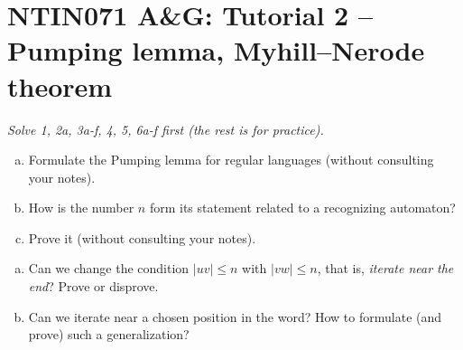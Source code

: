 \documentclass[a4paper,12pt]{amsart}
\begin{document}

\section*{NTIN071 A\&G: Tutorial 2 -- Pumping lemma, Myhill--Nerode theorem}


\medskip

\noindent\emph{Solve 1, 2a, 3a-f, 4, 5, 6a-f  first (the rest is for practice).}

\medskip

\medskip\begin{problem}
    
    \begin{enumerate}[(a)]\setlength\itemsep{12pt}
        \item Formulate the Pumping lemma for regular languages (without consulting your notes).
        \item How is the number $n$ form its statement related to a recognizing automaton?
        \item Prove it (without consulting your notes).
    \end{enumerate}

\end{problem}


\medskip\begin{problem}
    
    \begin{enumerate}[(a)]\setlength\itemsep{12pt}
        \item Can we change the condition $|uv|\leq n$ with $|vw|\leq n$, that is, \emph{iterate near the end}? Prove or disprove.
        \item Can we iterate near a chosen position in the word? How to formulate (and prove) such a generalization?
    \end{enumerate}
    
\end{problem}
    
\end{document}
